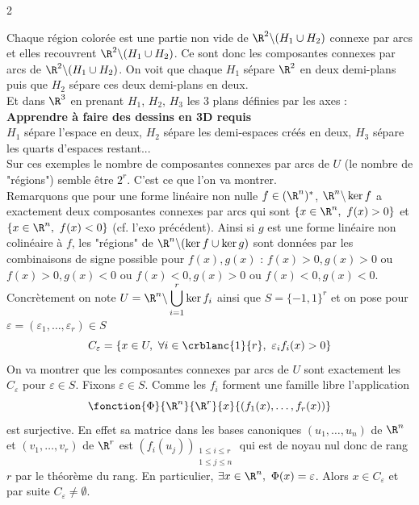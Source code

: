 \documentclass{book}
\begin{document}
\begin{enumerate}[leftmargin=*]
\begin{enumerate}[label=\alph*.]
\begin{multicols}{2}
			\end{multicols}
			Chaque région colorée est une partie non vide de $\R^2\backslash (H_1\cup H_2)$ connexe par arcs et elles recouvrent $\R^2\backslash (H_1\cup H_2)$. Ce sont donc les composantes connexes par arcs de $\R^2\backslash (H_1\cup H_2)$. On voit que chaque $H_1$ sépare $\R^2$ en deux demi-plans puis que $H_2$ sépare ces deux demi-plans en deux.\\
			Et dans $\R^3$ en prenant $H_1$, $H_2$, $H_3$ les 3 plans définies par les axes :\\
			\textbf{Apprendre à faire des dessins en 3D requis}\\
			$H_1$ sépare l'espace en deux, $H_2$ sépare les demi-espaces créés en deux, $H_3$ sépare les quarts d'espaces restant...\\
			Sur ces exemples le nombre de composantes connexes par arcs de $U$ (le nombre de "régions") semble être $2^r$. C'est ce que l'on va montrer.\\
			Remarquons que pour une forme linéaire non nulle $f\in (\R^n)^*$, $\R^n\backslash\ker f$ a exactement deux composantes connexes par arcs qui sont $\{x\in \R^n,\ f(x)>0\}$ et $\{x\in \R^n,\ f(x)<0\}$ (cf. l'exo précédent). Ainsi si $g$ est une forme linéaire non colinéaire à $f$, les "régions" de $\R^n\backslash(\ker f\cup\ker g)$ sont données par les combinaisons de signe possible pour $f(x),g(x)$ : $f(x)>0,g(x)>0$ ou $f(x)>0,g(x)<0$ ou $f(x)<0,g(x)>0$ ou $f(x)<0,g(x)<0$.\\
			Concrètement on note $U=\R^n\backslash\displaystyle\bigcup_{i=1}^r\ker f_i$ ainsi que $S=\{-1,1\}^r$ et on pose pour $\varepsilon=(\varepsilon_1,\dots,\varepsilon_r)\in S$
			$$C_\varepsilon=\{x\in U,\ \forall i\in \crblanc{1}{r},\ \varepsilon_if_i(x)>0\}$$
			On va montrer que les composantes connexes par arcs de $U$ sont exactement les $C_\varepsilon$ pour $\varepsilon\in S$. Fixons $\varepsilon\in S$. Comme les $f_i$ forment une famille libre l'application
			$$\fonction{\Phi}{\R^n}{\R^r}{x}{(f_1(x),\dots,f_r(x))}$$
			est surjective. En effet sa matrice dans les bases canoniques $(u_1,\dots,u_n)$ de $\R^n$ et $(v_1,\dots,v_r)$ de $\R^r$ est $(f_i(u_j))_{\substack{1\leq i\leq r\\1\leq j\leq n}}$ qui est de noyau nul donc de rang $r$ par le théorème du rang. En particulier, $\exists x\in \R^n,\ \Phi(x)=\varepsilon$. Alors $x\in C_\varepsilon$ et par suite $C_\varepsilon\ne\emptyset$.\\

\end{enumerate}
\end{enumerate}
\end{document}
